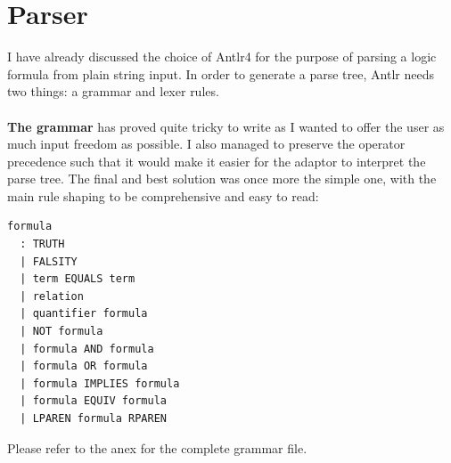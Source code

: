 \documentclass{report}
\begin{document}
\section{Parser}
I have already discussed the choice of Antlr4 for the purpose of parsing a logic 
formula from plain string input. In order to generate a parse tree, Antlr needs 
two things: a grammar and lexer rules. 
\\ \\
\textbf{The grammar} has proved quite tricky to write as I wanted to offer the 
user as much input freedom as possible. I also managed to preserve the operator 
precedence such that it would make it easier for the adaptor to interpret the 
parse tree. The final and best solution was once more the simple one, with the 
main rule shaping to be comprehensive and easy to read:
\begin{verbatim}
formula
  : TRUTH
  | FALSITY
  | term EQUALS term
  | relation
  | quantifier formula
  | NOT formula
  | formula AND formula
  | formula OR formula 
  | formula IMPLIES formula
  | formula EQUIV formula 
  | LPAREN formula RPAREN
\end{verbatim}
Please refer to the anex for the complete grammar file. 
\newpage
\end{document}
